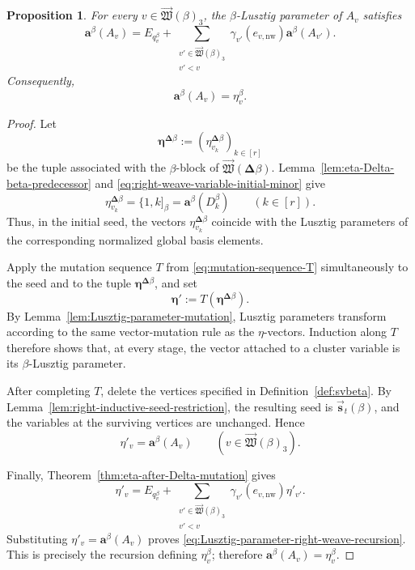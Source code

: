 \documentclass[12pt, reqno]{amsart}
\theoremstyle{plain}
\newtheorem{proposition}[theorem]{Proposition}
\theoremstyle{definition}
\numberwithin{equation}{section}
\begin{document}
\begin{proposition}
\label{pro:Lusztig-parameter-right-weave-variable}
For every
\(v\in\overrightarrow{\mathfrak W}(\beta)_3\), the
\(\beta\)-Lusztig parameter of \(A_v\) satisfies
\begin{equation}
\label{eq:Lusztig-parameter-right-weave-recursion}
    \mathbf a^\beta(A_v)
    =
    E_{q_v^\beta}
    +
    \sum_{\substack{
        v'\in\overrightarrow{\mathfrak W}(\beta)_3\\
        v'<v
    }}
    \gamma_{v'}(e_{v,\mathrm{nw}})
    \mathbf a^\beta(A_{v'}).
\end{equation}
Consequently,
\[
    \mathbf a^\beta(A_v)=\eta_v^\beta.
\]
\end{proposition}

\begin{proof}
Let
\[
    \boldsymbol\eta^{\boldsymbol{\Delta}\beta}
    :=
    \left(
        \eta_{v_k}^{\boldsymbol{\Delta}\beta}
    \right)_{k\in[r]}
\]
be the tuple associated with the \(\beta\)-block of
\(\overrightarrow{\mathfrak W}
(\boldsymbol{\Delta}\beta)\).
Lemma~\ref{lem:eta-Delta-beta-predecessor} and
\eqref{eq:right-weave-variable-initial-minor} give
\[
    \eta_{v_k}^{\boldsymbol{\Delta}\beta}
    =
    \{1,k]_\beta
    =
    \mathbf a^\beta(D_k^\beta)
    \qquad(k\in[r]).
\]
Thus, in the initial seed, the vectors
\(\eta_{v_k}^{\boldsymbol{\Delta}\beta}\) coincide with the Lusztig
parameters of the corresponding normalized global basis elements.

Apply the mutation sequence \(T\) from
\eqref{eq:mutation-sequence-T} simultaneously to the seed and to the
tuple \(\boldsymbol\eta^{\boldsymbol{\Delta}\beta}\), and set
\[
    \boldsymbol\eta'
    :=
    T\left(
        \boldsymbol\eta^{\boldsymbol{\Delta}\beta}
    \right).
\]
By Lemma~\ref{lem:Lusztig-parameter-mutation}, Lusztig parameters
transform according to the same vector-mutation rule as the
\(\eta\)-vectors. Induction along \(T\) therefore shows that, at every
stage, the vector attached to a cluster variable is its
\(\beta\)-Lusztig parameter.

After completing \(T\), delete the vertices specified in
Definition~\ref{def:svbeta}. By
Lemma~\ref{lem:right-inductive-seed-restriction}, the resulting seed
is \(\overrightarrow{\mathbf s}_t(\beta)\), and the variables at the
surviving vertices are unchanged. Hence
\[
    \eta'_v
    =
    \mathbf a^\beta(A_v)
    \qquad
    \left(
        v\in\overrightarrow{\mathfrak W}(\beta)_3
    \right).
\]

Finally, Theorem~\ref{thm:eta-after-Delta-mutation} gives
\[
    \eta'_v
    =
    E_{q_v^\beta}
    +
    \sum_{\substack{
        v'\in\overrightarrow{\mathfrak W}(\beta)_3\\
        v'<v
    }}
    \gamma_{v'}(e_{v,\mathrm{nw}})\eta'_{v'}.
\]
Substituting
\(\eta'_v=\mathbf a^\beta(A_v)\) proves
\eqref{eq:Lusztig-parameter-right-weave-recursion}. This is precisely
the recursion defining \(\eta_v^\beta\); therefore
\(\mathbf a^\beta(A_v)=\eta_v^\beta\).
\end{proof}
\end{document}
